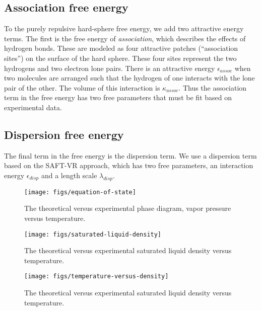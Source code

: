 \documentclass[letterpaper,twocolumn,amsmath,amssymb,prb]{revtex4}
\begin{document}
\subsection{Association free energy}
To the purely repulsive hard-sphere free energy, we add two attractive
energy terms.  The first is the free energy of \emph{association},
which describes the effects of hydrogen bonds.  These are modeled as
four attractive patches (``association sites'') on the surface of the
hard sphere.  These four sites represent the two hydrogens and two
electron lone pairs.  There is an attractive energy
$\epsilon_\textit{assoc}$ when two molecules are arranged such that
the hydrogen of one interacts with the lone pair of the other.  The
volume of this interaction is $\kappa_\textit{assoc}$.  Thus the
association term in the free energy has two free parameters that must
be fit based on experimental data.

\subsection{Dispersion free energy}
The final term in the free energy is the dispersion term.  We use a
dispersion term based on the SAFT-VR approach, which has two free
parameters, an interaction energy $\epsilon_\textit{disp}$ and a
length scale $\lambda_\textit{disp}$.


\begin{figure}
\begin{center}
\texttt{[image: figs/equation-of-state]}
\end{center}
\caption{The theoretical versus experimental phase diagram, vapor
  pressure versus temperature.  }
\label{fig:equation-of-state}
\end{figure}


\begin{figure}
\begin{center}
\texttt{[image: figs/saturated-liquid-density]}
\end{center}
\caption{The theoretical versus experimental saturated liquid density
  versus temperature.  }
\label{fig:saturated-liquid-density}
\end{figure}


\begin{figure}
\begin{center}
\texttt{[image: figs/temperature-versus-density]}
\end{center}
\caption{The theoretical versus experimental saturated liquid density
  versus temperature.  }
\label{fig:saturated-liquid-density}
\end{figure}
\end{document}
